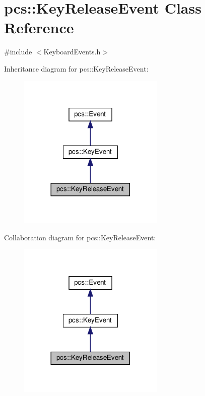 \hypertarget{classpcs_1_1KeyReleaseEvent}{}\section{pcs\+:\+:Key\+Release\+Event Class Reference}
\label{classpcs_1_1KeyReleaseEvent}


{\ttfamily \#include $<$Keyboard\+Events.\+h$>$}



Inheritance diagram for pcs\+:\+:Key\+Release\+Event\+:\nopagebreak
\begin{figure}[H]
\begin{center}
\leavevmode
\includegraphics[width=197pt]{classpcs_1_1KeyReleaseEvent__inherit__graph}
\end{center}
\end{figure}


Collaboration diagram for pcs\+:\+:Key\+Release\+Event\+:\nopagebreak
\begin{figure}[H]
\begin{center}
\leavevmode
\includegraphics[width=197pt]{classpcs_1_1KeyReleaseEvent__coll__graph}
\end{center}
\end{figure}

